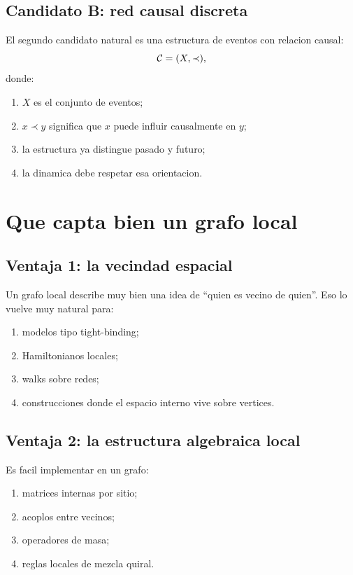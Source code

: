 \subsection{Candidato B: red causal discreta}
El segundo candidato natural es una estructura de eventos con relacion causal:
\begin{equation}
\mathcal{C}=(X,\prec),
\end{equation}
donde:
\begin{enumerate}[label=\arabic*.]
    \item \(X\) es el conjunto de eventos;
    \item \(x\prec y\) significa que \(x\) puede influir causalmente en \(y\);
    \item la estructura ya distingue pasado y futuro;
    \item la dinamica debe respetar esa orientacion.
\end{enumerate}

\section{Que capta bien un grafo local}
\subsection{Ventaja 1: la vecindad espacial}
Un grafo local describe muy bien una idea de \enquote{quien es vecino de quien}. Eso lo vuelve muy natural para:
\begin{enumerate}[label=\arabic*.]
    \item modelos tipo tight-binding;
    \item Hamiltonianos locales;
    \item walks sobre redes;
    \item construcciones donde el espacio interno vive sobre vertices.
\end{enumerate}

\subsection{Ventaja 2: la estructura algebraica local}
Es facil implementar en un grafo:
\begin{enumerate}[label=\arabic*.]
    \item matrices internas por sitio;
    \item acoplos entre vecinos;
    \item operadores de masa;
    \item reglas locales de mezcla quiral.
\end{enumerate}


